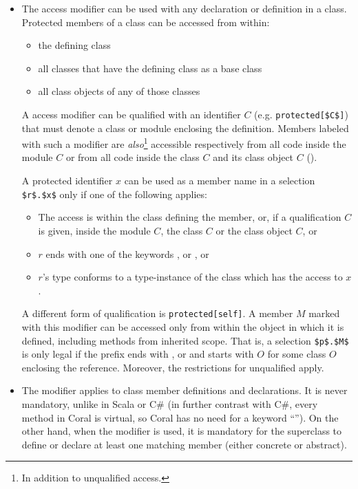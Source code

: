 \begin{itemize}
\item
The  access modifier can be used with any declaration or definition in a class. Protected members of a class can be accessed from within: 
\begin{itemize}
\item the defining class
\item all classes that have the defining class as a base class
\item all class objects of any of those classes
\end{itemize}

A  access modifier can be qualified with an identifier $C$ (e.g. \lstinline!protected[$C$]!) that must denote a class or module enclosing the definition. Members labeled with such a modifier are {\em also}\footnote{In addition to unqualified  access.} accessible respectively from all code inside the module $C$ or from all code inside the class $C$ and its class object $C$ (). 

A protected identifier $x$ can be used as a member name in a selection \lstinline!$r$.$x$! only if one of the following applies: 
\begin{itemize}
\item The access is within the class defining the member, or, if a qualification $C$ is given, inside the module $C$, the class $C$ or the class object $C$, or
\item $r$ ends with one of the keywords ,  or , or
\item $r$'s type conforms to a type-instance of the class which has the access to $x$. 
\end{itemize}

A different form of qualification is \lstinline!protected[self]!. A member $M$ marked with this modifier can be accessed only from within the object in which it is defined, including methods from inherited scope. That is, a selection \lstinline!$p$.$M$! is only legal if the prefix ends with ,  or  and starts with $O$ for some class $O$ enclosing the reference. Moreover, the restrictions for unqualified  apply. 

\item
The  modifier applies to class member definitions and declarations. It is never mandatory, unlike in Scala or C\# (in further contrast with C\#, every method in Coral is virtual, so Coral has no need for a keyword ``''). On the other hand, when the modifier is used, it is mandatory for the superclass to define or declare at least one matching member (either concrete or abstract). 


\end{itemize}
